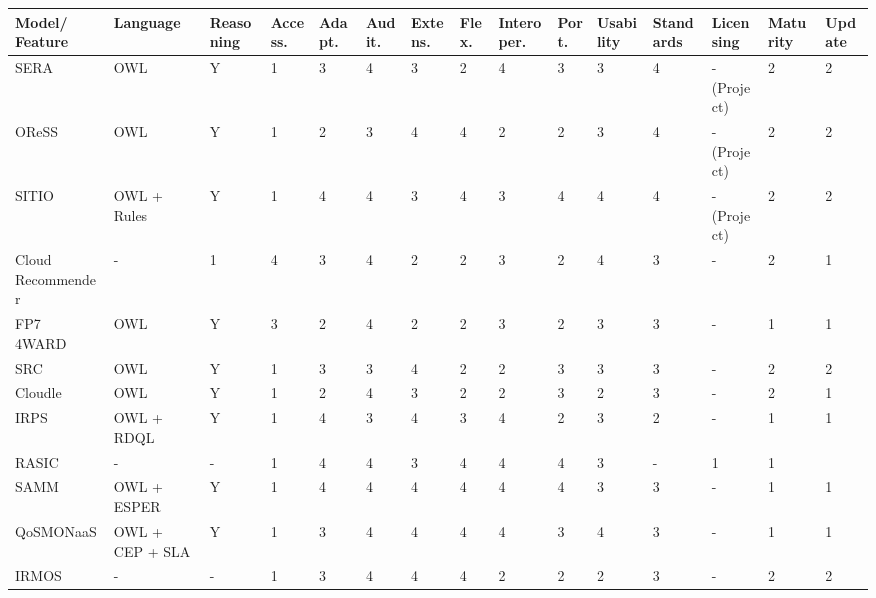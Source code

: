 \begin{sidewaystable}[!ht]
\renewcommand{\arraystretch}{1.3}
\tiny
\begin{center}
\begin{tabular}[c]{|p{2.5cm}|p{1.2cm}|p{1.2cm}|p{1.2cm}|p{0.8cm}|p{0.8cm}|p{0.8cm}|p{0.8cm}|p{1.1cm}|p{1.1cm}|p{1.1cm}|p{1.1cm}|p{1.1cm}|p{1.1cm}|p{1.1cm}|} 
\hline
  \textbf{Model/ Feature} & \textbf{Language} & \textbf{Reasoning} & \textbf{Access.} & \textbf{Adapt.} & \textbf{Audit.} & \textbf{Extens.} & \textbf{Flex.} & \textbf{Interoper.} & \textbf{Port.} & \textbf{Usability} & \textbf{Standards} & \textbf{Licensing} & \textbf{Maturity} & \textbf{Update} \\ \hline
   SERA~\cite{Ejarque:2008:USR:1443230.1444322} & OWL & Y & 1 & 3 & 4 & 3 & 2 & 4 & 3 & 3 & 4 & - (Project) & 2 & 2 \\ \hline
   OReSS~\cite{2009gdc..conf..221Y} & OWL & Y & 1 & 2 & 3 & 4 & 4 & 2 & 2 & 3 & 4 & - (Project) & 2 & 2 \\ \hline
   SITIO~\cite{Garcia-Sanchez:2010:ASS:1852403.1852409} & OWL + Rules & Y & 1 & 4 & 4  & 3 & 4 & 3 & 4 & 4 & 4 & -(Project) & 2 & 2 \\ \hline
   Cloud Recommender~\cite{DBLP:conf/gecon/ZhangRNMH12} & - & 1 & 4 & 3 & 4 & 2 & 2 & 3 & 2 & 4 & 3 & - & 2 & 1 \\ \hline
   FP7 4WARD~\cite{5682131} & OWL & Y & 3 & 2 & 4 & 2 & 2 & 3 & 2& 3 & 3 & -& 1 & 1 \\ \hline
   SRC~\cite{DBLP:conf/soca/ChenL10} & OWL & Y & 1 & 3 & 3 & 4 & 2 & 2 &3 & 3  & 3 & - & 2 & 2 \\ \hline
   Cloudle~\cite{5682131} & OWL & Y & 1 & 2 & 4 & 3& 2& 2 & 3& 2& 3& -&2 &1 \\ \hline
   IRPS~\cite{6206823} & OWL + RDQL& Y & 1 & 4&3 &4 & 3& 4& 2& 3& 2& -&1&1 \\ \hline
   RASIC~\cite{Buyya:2010:IUF:2143583.2143586} &- & -& 1 & 4 & 4& 3& 4& 4& 4& 3& -&1 &1 \\ \hline
   SAMM~\cite{fg-2266} & OWL + ESPER & Y & 1 & 4&4 &4 &4 &4 & 4& 3& 3&- & 1&1 \\ \hline
   QoSMONaaS~\cite{srt-15} & OWL + CEP + SLA& Y & 1&3 &4 &4 & 4& 4& 3& 4& 3& -& 1&1 \\ \hline
   IRMOS~\cite{DBLP:conf/compsac/CucinottaAA10}  & -&- &1 & 3& 4& 4& 4& 2& 2& 2& 3& -&2 &2 \\ \hline

\end{tabular}
\end{center}
\end{sidewaystable}
